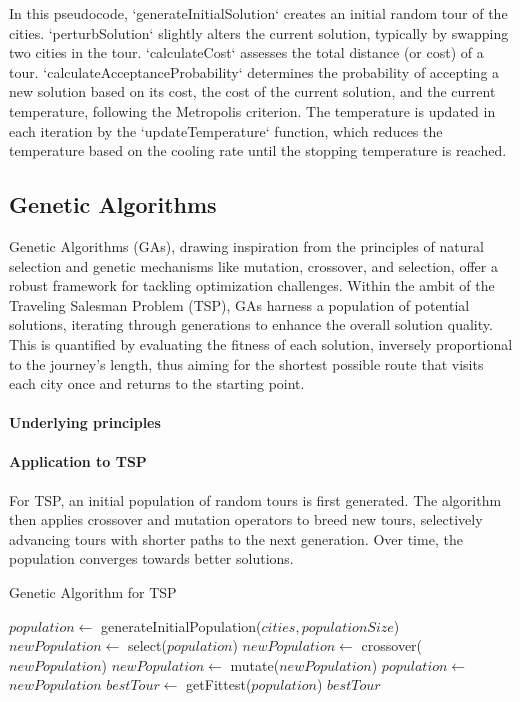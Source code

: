 In this pseudocode, `generateInitialSolution` creates an initial random tour of the cities. `perturbSolution` slightly alters the current solution, typically by swapping two cities in the tour. `calculateCost` assesses the total distance (or cost) of a tour. `calculateAcceptanceProbability` determines the probability of accepting a new solution based on its cost, the cost of the current solution, and the current temperature, following the Metropolis criterion. The temperature is updated in each iteration by the `updateTemperature` function, which reduces the temperature based on the cooling rate until the stopping temperature is reached.


\subsection{Genetic Algorithms}

Genetic Algorithms (GAs), drawing inspiration from the principles of natural selection and genetic mechanisms like mutation, crossover, and selection, offer a robust framework for tackling optimization challenges. Within the ambit of the Traveling Salesman Problem (TSP), GAs harness a population of potential solutions, iterating through generations to enhance the overall solution quality. This is quantified by evaluating the fitness of each solution, inversely proportional to the journey's length, thus aiming for the shortest possible route that visits each city once and returns to the starting point.

\paragraph{Underlying principles}


\paragraph{Application to TSP}

For TSP, an initial population of random tours is first generated. The algorithm then applies crossover and mutation operators to breed new tours, selectively advancing tours with shorter paths to the next generation. Over time, the population converges towards better solutions.

\begin{algorithm}
	\caption{Genetic Algorithm for TSP}\label{alg:geneticalgorithm}
	\begin{algorithmic}[1]
		\State $population \gets$ generateInitialPopulation($cities, populationSize$)
		\State $newPopulation \gets$ select($population$)
		\State $newPopulation \gets$ crossover($newPopulation$)
		\State $newPopulation \gets$ mutate($newPopulation$)
		\State $population \gets$ $newPopulation$
		\EndFor
		\State $bestTour \gets$ getFittest($population$)
		\State \Return $bestTour$
		\EndProcedure
	\end{algorithmic}
\end{algorithm}


